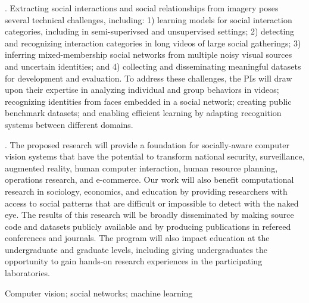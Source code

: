 . Extracting social interactions and social relationships from imagery poses several technical challenges, including: 1) learning models for social interaction categories, including in semi-superivsed and unsupervised settings; 2) detecting and recognizing interaction categories in long videos of large social gatherings; 3) inferring mixed-membership social networks from multiple noisy visual sources and uncertain identities; and 4) collecting and disseminating meaningful datasets for development and evaluation. To address these challenges, the PIs will draw upon their expertise in analyzing individual and group behaviors in videos; recognizing identities from faces embedded in a social network; creating public benchmark datasets; and enabling efficient learning by adapting recognition systems between different domains.

. The proposed research will provide a foundation for socially-aware computer vision systems that have the potential to transform national security, surveillance, augmented reality, human computer interaction, human resource planning, operations research, and e-commerce.
Our work will also benefit computational research in sociology, economics, and education by providing researchers with access to social patterns that are difficult or impossible to detect with the naked eye. The results of this research will be broadly disseminated by making source code and datasets publicly available and by producing publications in refereed conferences and journals. The program will also impact education at the undergraduate and graduate levels, including giving undergraduates the opportunity to gain hands-on research experiences in the participating laboratories. 

 Computer vision; social networks; machine learning


